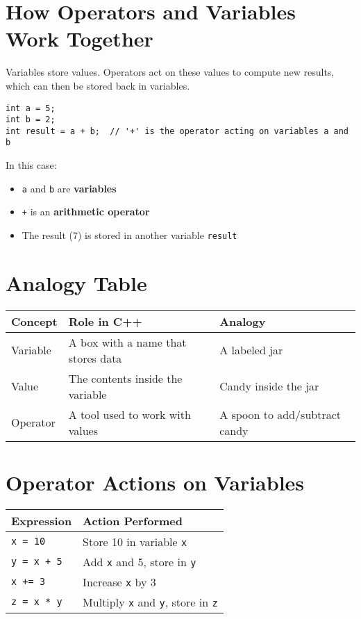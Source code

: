 \documentclass{article}
\begin{document}
\section{How Operators and Variables Work Together}

Variables store values.  
Operators act on these values to compute new results, which can then be stored back in variables.

\begin{verbatim}
int a = 5;
int b = 2;
int result = a + b;  // '+' is the operator acting on variables a and b
\end{verbatim}

In this case:
\begin{itemize}
    \item \texttt{a} and \texttt{b} are \textbf{variables}
    \item \texttt{+} is an \textbf{arithmetic operator}
    \item The result (7) is stored in another variable \texttt{result}
\end{itemize}

\section{Analogy Table}

\begin{center}
\begin{tabular}{|l|l|l|}
\hline
\textbf{Concept} & \textbf{Role in C++} & \textbf{Analogy} \\
\hline
Variable & A box with a name that stores data & A labeled jar \\
Value & The contents inside the variable & Candy inside the jar \\
Operator & A tool used to work with values & A spoon to add/subtract candy \\
\hline
\end{tabular}
\end{center}

\section{Operator Actions on Variables}

\begin{center}
\begin{tabular}{|l|l|}
\hline
\textbf{Expression} & \textbf{Action Performed} \\
\hline
\texttt{x = 10} & Store 10 in variable \texttt{x} \\
\texttt{y = x + 5} & Add \texttt{x} and 5, store in \texttt{y} \\
\texttt{x += 3} & Increase \texttt{x} by 3 \\
\texttt{z = x * y} & Multiply \texttt{x} and \texttt{y}, store in \texttt{z} \\
\hline
\end{tabular}
\end{center}
\end{document}
